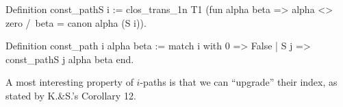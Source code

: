\begin{Coqsrc}
Definition const_pathS i :=
  clos_trans_1n T1 (fun alpha beta => alpha <> zero /\
                                      beta = canon alpha (S i)).

Definition const_path i alpha beta :=
  match i with
    0 => False
  | S j => const_pathS j alpha beta
end.
\end{Coqsrc}














A most interesting property of $i$-paths is that we can ``upgrade'' their index, as stated by K.\&S.'s Corollary 12.

